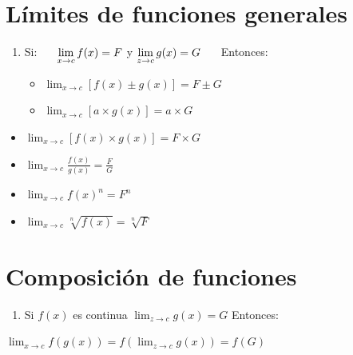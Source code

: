 \documentclass[12pt,a4paper]{article}
\begin{document}
    \section{\textcolor{violeta}{Límites de funciones generales}}
    \begin{tcolorbox}[colback=white!5!white,colframe=violeta!75!black]
        \begin{enumerate}
            \centering
            \item Si: $\hspace{0.5cm}\displaystyle\lim_{x\to{c}}{f (x)}=F $ y $\displaystyle\lim_{z\to{c}}{g (x)}=G \hspace{0.5cm}$ Entonces:
            \begin{multicols}{2}
                \begin{itemize}
                    \item $\displaystyle\lim_{x\to{c}}{\left[f (x)\pm{g (x)}\right]}=F\pm{G} $
                    \item $\displaystyle\lim_{x\to{c}}{\left[a\times{g (x)}\right]}=a\times{G} $
                \end{itemize}
            \end{multicols}            
        \end{enumerate}
    \end{tcolorbox}
    \begin{tcolorbox}[colback=white!5!white,colframe=violeta!75!black]
        \begin{multicols}{2}
            \centering
            \begin{itemize}
                \item $\displaystyle\lim_{x\to{c}}{\left[f (x)\times{g (x)}\right]}=F\times{G} $
                \item $\displaystyle\lim_{x\to{c}}{\frac{f (x)}{g (x)}}=\frac{F}{G} $
                \item $\displaystyle\lim_{x\to{c}}{f (x)^n}=F^n $
                \item $\displaystyle\lim_{x\to{c}}{\sqrt[n]{f (x)}}=\sqrt[n]{F} $
            \end{itemize}
         \end{multicols}            
    \end{tcolorbox}
    
    \section{\textcolor{violeta}{Composición de funciones}}
    \begin{tcolorbox}[colback=white!5!white,colframe=violeta!75!black]
        \begin{enumerate}
            \item Si $f (x)$ es continua $\displaystyle\lim_{z\to{c}}{g (x)}=G $ Entonces:
        \end{enumerate}
        \centering
        $\displaystyle\lim_{x\to{c}}{f (g (x))}=f (\displaystyle\lim_{z\to{c}}{g (x)})=f (G) $
    \end{tcolorbox}
\end{document}
